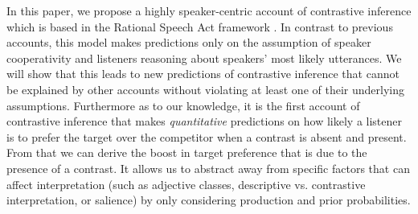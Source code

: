 \documentclass[a4paper,man,floatsintext,natbib]{apa6}
\newcommand{\ek}[1]{\textcolor{Orange}{[ek: #1]}}
\begin{document}

In this paper, we propose a highly speaker-centric account of contrastive inference which is based in the Rational Speech Act framework \citep{Frank:2012,Goodman:2016}. In contrast to previous accounts, this model makes predictions only on the assumption of speaker cooperativity and listeners reasoning about speakers' most likely utterances. We will show that this leads to new predictions of contrastive inference that cannot be explained by other accounts without violating at least one of their underlying assumptions. Furthermore as to our knowledge, it is the first account of contrastive inference that makes \emph{quantitative} predictions on how likely a listener is to prefer the target over the competitor when a contrast is absent and present. From that we can derive the boost in target preference that is due to the presence of a contrast. It allows us to abstract away from specific factors that can affect interpretation (such as adjective classes, descriptive vs. contrastive interpretation, or salience) by only considering production and prior probabilities. 
\end{document}
